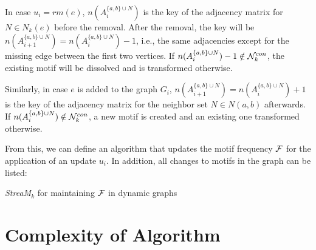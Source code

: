 \documentclass{article}
\begin{document}
In case $u_i = rm(e)$, $n(A_i^{\{a,b\} \cup N})$ is the key of the adjacency matrix for $N \in N_k(e)$ before the removal.
After the removal, the key will be $n(A_{i+1}^{\{a,b\} \cup N}) = n(A_i^{\{a,b\} \cup N})-1$, i.e., the same adjacencies except for the missing edge between the first two vertices.
If $n(A_i^{\{a,b\} \cup N})-1 \notin {\cal N}_k^{con}$, the existing motif will be dissolved and is transformed otherwise.

Similarly, in case $e$ is added to the graph $G_i$, $n(A_{i+1}^{\{a,b\} \cup N}) = n(A_i^{\{a,b\} \cup N})+1$ is the key of the adjacency matrix for the neighbor set $N \in N(a,b)$ afterwards.
If $n(A_i^{\{a,b\} \cup N}) \notin {\cal N}_k^{con}$, a new motif is created and an existing one transformed otherwise.

From this, we can define an algorithm that updates the motif frequency ${\cal F}$ for the application of an update $u_i$.
In addition, all changes to motifs in the graph can be listed:

\begin{algorithm}[!htb]
	\caption{\emph{StreaM$_k$} for maintaining ${\cal F}$ in dynamic graphs}
	\label{alg:u}
\end{algorithm}




\section{Complexity of Algorithm}

\end{document}
